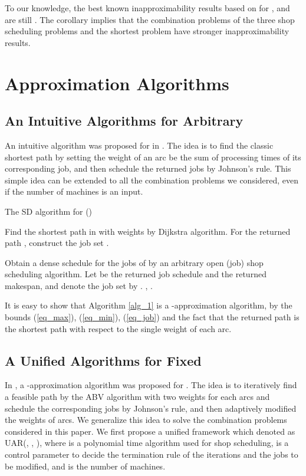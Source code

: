 \documentclass{llncs}
\numberwithin{subcase}{case}
\begin{document}
To our knowledge, the best known inapproximability results based on  for ,  and  are still . The corollary implies that the combination problems of the three shop scheduling problems and the shortest problem have stronger inapproximability results.

\section{Approximation Algorithms}\label{sec_approx}
\subsection{An Intuitive Algorithms for Arbitrary }\label{sec_alg_nat}
An intuitive algorithm was proposed for  in \cite{NW13}. The idea is to find the classic shortest path by setting the weight of an arc be the sum of processing times of its corresponding job, and then schedule the returned jobs by Johnson's rule. This simple idea can be extended to all the combination problems we considered, even if the number of machines is an input.

\begin{algorithm}[htb]
\caption{The SD algorithm for {\small ()}}
\label{alg_1}
\begin{algorithmic}[1]
\STATE Find the shortest path in  with weights  by Dijkstra algorithm. For the returned path , construct the job set .

\STATE Obtain a dense schedule for the jobs of  by an arbitrary open (job) shop scheduling algorithm. Let   be the returned job schedule and  the returned makespan, and denote the job set  by .
\RETURN ,  \AND .
\end{algorithmic}
\end{algorithm}

It is easy to show that Algorithm \ref{alg_1} is a -approximation algorithm,
by the bounds (\ref{eq_max}), (\ref{eq_min}), (\ref{eq_job}) and the fact that the returned path is the shortest path with respect to the single weight of each arc.



\subsection{A Unified Algorithms for Fixed }\label{sec_alg_im}
In \cite{NW13}, a -approximation algorithm was proposed for . The idea is to iteratively find a feasible path by the ABV algorithm with two weights for each arcs and schedule the corresponding jobs by Johnson's rule, and then adaptively modified the weights of arcs. We generalize this idea to solve the combination problems considered in this paper. We first propose a unified framework which denoted as UAR(, , ), where  is a polynomial time algorithm used for shop scheduling,  is a control parameter to decide the termination rule of the iterations and the jobs to be modified, and  is the number of machines.
\end{document}
